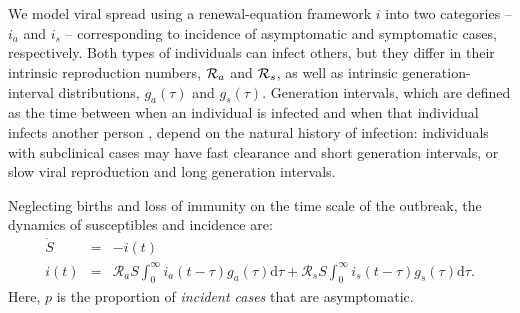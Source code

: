 \DIFaddbegin \section{}

\DIFaddend We model viral spread using a renewal-equation framework \DIFdelbegin {}\DIFdelend \DIFaddbegin {}\DIFaddend $i$ \DIFdelbegin {}\DIFdelend into two categories -- $i_a$ and $i_s$ -- corresponding to incidence of asymptomatic and symptomatic cases, respectively.
Both types of individuals can infect others, but they differ in their intrinsic reproduction numbers, ${\cal{R}}_a$ and ${\cal{R}}_s$, as well as intrinsic generation-interval distributions, $g_a(\tau)$ and $g_s(\tau)$.
Generation intervals, which are defined as the time between when an individual is infected and when that individual infects another person \citep{svensson2007note}, depend on the natural history of infection:
individuals with subclinical cases may have fast clearance and short generation intervals, or slow viral reproduction and long generation intervals.
\DIFaddbegin {}\DIFaddend 

Neglecting births and loss of immunity on the time scale of the outbreak, the dynamics of susceptibles and incidence are:
\begin{eqnarray}
\dot{S}&=&-i(t) \\
i(t)&=&\mathcal R_a S \int_0^\infty i_a(t-\tau) g_a(\tau) \mathrm{d}\tau + \mathcal R_s S \int_0^\infty i_s(t-\tau) g_s(\tau) \mathrm{d}\tau.
\end{eqnarray}
Here, $p$ is the proportion of \emph{incident cases} that are asymptomatic.

